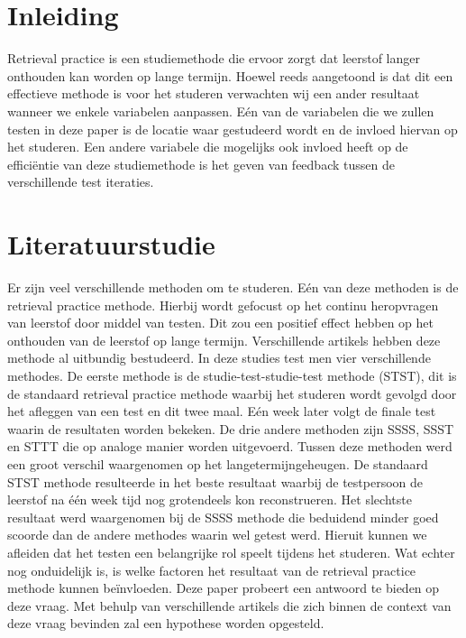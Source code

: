 \documentclass{hogent-article}
\affiliation{
	\textsuperscript{1} \href{mailto:olivier.troch.w2257@student.hogent.be}{Olivier.troch.w2257@student.hogent.be}
}
\affiliation{
	\textsuperscript{2} \href{mailto:daan.vanvooren.y1502@student.hogent.be}{daan.vanvooren.y1502@student.hogent.be}
}
\affiliation{
	\textsuperscript{3}
	\href{mailto:robbie.verdurme.y9234@student.hogent.be}{robbie.verdurme.y9234@student.hogent.be}
}
\affiliation{
	\textsuperscript{4}
	\href{mailto;sebastien.wojtyla.y3274@student.hogent.be}{sebastien.wojtyla.y3274@student.hogent.be}
}
\begin{document}
	
	\flushbottom %
	\maketitle %
	\tableofcontents %
	\thispagestyle{empty} %
	
	
	\section{Inleiding}
	Retrieval practice is een studiemethode die ervoor zorgt dat leerstof langer onthouden kan worden op lange termijn. Hoewel reeds aangetoond is dat dit een effectieve methode is voor het studeren verwachten wij een ander resultaat wanneer we enkele variabelen aanpassen. Eén van de variabelen die we zullen testen in deze paper is de locatie waar gestudeerd wordt en de invloed hiervan op het studeren. 
	Een andere variabele die mogelijks ook invloed heeft op de efficiëntie van deze studiemethode is het geven van feedback tussen de verschillende test iteraties.
	
	\section{Literatuurstudie}
	Er zijn veel verschillende methoden om te studeren. Eén van deze methoden is de retrieval practice methode. Hierbij wordt gefocust op het continu heropvragen van leerstof door middel van testen. Dit zou een positief effect hebben op het onthouden van de leerstof op lange termijn.
    Verschillende artikels \autocite{butler2010repeated, pyc2012test, karpicke2007repeated, karpicke2008critical} hebben deze methode al uitbundig bestudeerd. In deze studies test men vier verschillende methodes. De eerste methode is de studie-test-studie-test methode (STST), dit is de standaard retrieval practice methode waarbij het studeren wordt gevolgd door het afleggen van een test en dit twee maal. Eén week later volgt de finale test waarin de resultaten worden bekeken. De drie andere methoden zijn SSSS, SSST en STTT die op analoge manier worden uitgevoerd.
	Tussen deze methoden werd een groot verschil waargenomen op het langetermijngeheugen. De standaard STST methode resulteerde in het beste resultaat waarbij de testpersoon de leerstof na één week tijd nog grotendeels kon reconstrueren. Het slechtste resultaat werd waargenomen bij de SSSS methode die beduidend minder goed scoorde dan de andere methodes waarin wel getest werd. Hieruit kunnen we afleiden dat het testen een belangrijke rol speelt tijdens het studeren. Wat echter nog onduidelijk is, is welke factoren het resultaat van de retrieval practice methode kunnen beïnvloeden. Deze paper probeert een antwoord te bieden op deze vraag. Met behulp van verschillende artikels die zich binnen de context van deze vraag bevinden zal een hypothese worden opgesteld.
    
\end{document}
